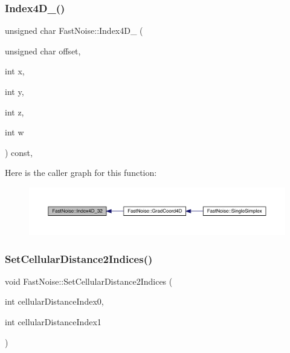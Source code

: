 \mbox{\label{class_fast_noise_a00c08735b1ca018af621a1297964a547}} 
\subsubsection{\texorpdfstring{Index4\+D\+\_()}{Index4D\_32()}}
{\footnotesize\ttfamily unsigned char Fast\+Noise\+::\+Index4\+D\+\_ (\begin{DoxyParamCaption}\item[{unsigned char}]{offset,  }\item[{int}]{x,  }\item[{int}]{y,  }\item[{int}]{z,  }\item[{int}]{w }\end{DoxyParamCaption}) const\hspace{0.3cm}{\ttfamily [inline]}, {\ttfamily [private]}}

Here is the caller graph for this function\+:
\nopagebreak
\begin{figure}[H]
\begin{center}
\leavevmode
\includegraphics[width=350pt]{class_fast_noise_a00c08735b1ca018af621a1297964a547_icgraph}
\end{center}
\end{figure}
\mbox{\label{class_fast_noise_afcd4ef6ef500424eea447449bd1eac8b}} 
\subsubsection{\texorpdfstring{Set\+Cellular\+Distance2\+Indices()}{SetCellularDistance2Indices()}}
{\footnotesize\ttfamily void Fast\+Noise\+::\+Set\+Cellular\+Distance2\+Indices (\begin{DoxyParamCaption}\item[{int}]{cellular\+Distance\+Index0,  }\item[{int}]{cellular\+Distance\+Index1 }\end{DoxyParamCaption})}


